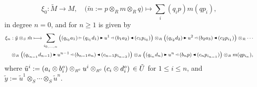 \documentclass[reqno, a4paper, 10pt]{amsart}
\numberwithin{equation}{section}
\theoremstyle{plain}
\theoremstyle{definition}
\theoremstyle{remark}
\begin{document}
$$
\xi_0: \tilde{M} \longrightarrow M, \quad \big( {\tilde{{m}}}:=p \otimes_{{\scriptscriptstyle{R}}} m \otimes_{{\scriptscriptstyle{R}}} q\big) \longmapsto \sum_i(q_ip)m(qp_i),
$$
in degree $n = 0$, and for $n \geq 1$ is given by
\begin{equation*}
\begin{footnotesize}
{
\begin{split}
& \xi_n:  {\tilde{{y}}} \otimes_{{\scriptscriptstyle{S}}} \tilde{m} \longmapsto  
\sum_{i_{0, \ldots, n}} 
{\big( { (q_{i_0}a_1) {{\,\raise1pt\hbox{$\scriptscriptstyle{\rhd}$} \, }} (q_{i_1}d_1) {{\,\raise1pt\hbox{$\scriptscriptstyle{\blacktriangleright}$} \, }} u^1 {{\,\raise1pt\hbox{$\scriptscriptstyle{\lhd}$} \, }} (b_1a_2) {{\,\raise1pt\hbox{$\scriptscriptstyle{\blacktriangleleft}$} \, }} (c_1p_{i_0}) } \big)} \otimes_{{\scriptscriptstyle{R}}} 
{\big( {(q_{i_2}d_2) {{\,\raise1pt\hbox{$\scriptscriptstyle{\blacktriangleright}$} \, }} u^2 {{\,\raise1pt\hbox{$\scriptscriptstyle{\lhd}$} \, }} (b_2a_3) {{\,\raise1pt\hbox{$\scriptscriptstyle{\blacktriangleleft}$} \, }} (c_2p_{i_1}) } \big)} \otimes_{{\scriptscriptstyle{R}}} \cdots
 \\
&  \quad \otimes_{{\scriptscriptstyle{R}}} {\big( {(q_{i_{n-1}}d_{n-1}) {{\,\raise1pt\hbox{$\scriptscriptstyle{\blacktriangleright}$} \, }} u^{n-1} {{\,\raise1pt\hbox{$\scriptscriptstyle{\lhd}$} \, }} (b_{n-1}a_n) {{\,\raise1pt\hbox{$\scriptscriptstyle{\blacktriangleleft}$} \, }} (c_{n-1}p_{i_{n-2}})} \big)} 
\otimes_{{\scriptscriptstyle{R}}} 
{\big( {(q_{i_n} d_n) {{\,\raise1pt\hbox{$\scriptscriptstyle{\blacktriangleright}$} \, }} u^n {{\,\raise1pt\hbox{$\scriptscriptstyle{\lhd}$} \, }} (b_n p) {{\,\raise1pt\hbox{$\scriptscriptstyle{\blacktriangleleft}$} \, }} (c_np_{i_{n-1}})} \big)} \otimes_{{\scriptscriptstyle{R}}} m(qp_{i_n}),
\end{split} }
\end{footnotesize}
\end{equation*}
where $\tilde{u}^i := (a_i \otimes b^o_i) \otimes_{{\scriptscriptstyle{{R^{\rm e}}}}} u^i \otimes_{{\scriptscriptstyle{{R^{\rm e}}}}} (c_i \otimes d^o_i) \,\in {\tilde{{U}}}$ 
for $1 \leq i \leq n$, and
$\tilde{y}:= \tilde{u}^1 \otimes_{{\scriptscriptstyle{S}}} \cdots \otimes_{{\scriptscriptstyle{S}}} \tilde{u}^n$.
\end{document}
